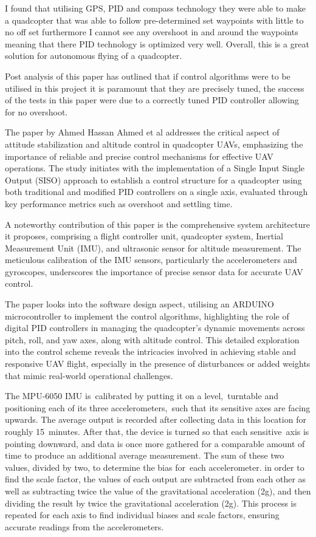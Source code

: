 \documentclass{report}
\begin{document}
I found that utilising GPS, PID and compass technology they were able to make a
quadcopter that was able to follow pre-determined set waypoints with little to
no off set furthermore I cannot see any overshoot in and around the waypoints
meaning that there PID technology is optimized very well. Overall, this is a
great solution for autonomous flying of a quadcopter.

Post analysis of this paper has outlined that if control algorithms were to be
utilised in this project it is paramount that they are precisely tuned, the
success of the tests in this paper were due to a correctly tuned PID controller
allowing for no overshoot. 

The paper by Ahmed Hassan Ahmed et al \cite{AhmedHassan2016} addresses the
critical aspect of attitude stabilization and altitude control in quadcopter
UAVs, emphasizing the importance of reliable and precise control mechanisms for
effective UAV operations. The study initiates with the implementation of a
Single Input Single Output (SISO) approach to establish a control structure for
a quadcopter using both traditional and modified PID controllers on a single
axis, evaluated through key performance metrics such as overshoot and settling
time.

A noteworthy contribution of this paper is the comprehensive system architecture
it proposes, comprising a flight controller unit, quadcopter system, Inertial
Measurement Unit (IMU), and ultrasonic sensor for altitude measurement. The
meticulous calibration of the IMU sensors, particularly the accelerometers and
gyroscopes, underscores the importance of precise sensor data for accurate UAV
control.

The paper looks into the software design aspect, utilising an ARDUINO
microcontroller to implement the control algorithms, highlighting the role of
digital PID controllers in managing the quadcopter's dynamic movements across
pitch, roll, and yaw axes, along with altitude control. This detailed
exploration into the control scheme reveals the intricacies involved in
achieving stable and responsive UAV flight, especially in the presence of
disturbances or added weights that mimic real-world operational challenges.

The MPU-6050 IMU is calibrated by putting it on a level, turntable and
positioning each of its three accelerometers, such that its sensitive axes are
facing upwards. The average output is recorded after collecting data in this
location for roughly 15 minutes. After that, the device is turned so that each
sensitive axis is pointing downward, and data is once more gathered for a
comparable amount of time to produce an additional average measurement. The sum
of these two values, divided by two, to determine the bias for each
accelerometer. in order to find the scale factor, the values of each output are
subtracted from each other as well as subtracting twice the value of the
gravitational acceleration (2g), and then dividing the result by twice the
gravitational acceleration (2g). This process is repeated for each axis to find
individual biases and scale factors, ensuring accurate readings from the
accelerometers.
\end{document}
